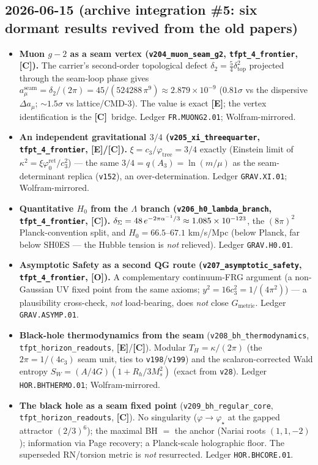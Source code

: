 \documentclass[11pt]{article}
\providecommand{\mE}{\textbf{[E]}}\providecommand{\mC}{\textbf{[C]}}
\providecommand{\mO}{\textbf{[O]}}\providecommand{\mX}{\textbf{[X]}}
\providecommand{\cthree}{c_3}\providecommand{\phiz}{\varphi_0^{\mathrm{ret}}}
\begin{document}
\subsection*{2026-06-15 (archive integration \#5: six dormant results revived from the old papers)}
\begin{itemize}
\item \textbf{Muon $g-2$ as a seam vertex (\texttt{v204\_muon\_seam\_g2}, \texttt{tfpt\_4\_frontier}, \mC).}
  The carrier's second-order topological defect $\delta_2=\tfrac54\delta_{\mathrm{top}}^2$ projected through the
  seam-loop phase gives $a_\mu^{\mathrm{seam}}=\delta_2/(2\pi)=45/(524288\,\pi^9)\approx2.879\times10^{-9}$
  ($0.81\sigma$ vs the dispersive $\Delta a_\mu$; ${\sim}1.5\sigma$ vs lattice/CMD-3). The value is exact \mE;
  the vertex identification is the \mC\ bridge. Ledger \texttt{FR.MUONG2.01}; Wolfram-mirrored.
\item \textbf{An independent gravitational $3/4$ (\texttt{v205\_xi\_threequarter}, \texttt{tfpt\_4\_frontier}, \mE/\mC).}
  $\xi=\cthree/\varphi_{\mathrm{tree}}=3/4$ exactly (Einstein limit of $\kappa^2=\xi\phiz/\cthree^2$) --- the
  same $3/4=q(A_3)=\ln(m/\mu)$ as the seam-determinant replica (\texttt{v152}), an over-determination. Ledger
  \texttt{GRAV.XI.01}; Wolfram-mirrored.
\item \textbf{Quantitative $H_0$ from the $\Lambda$ branch (\texttt{v206\_h0\_lambda\_branch}, \texttt{tfpt\_4\_frontier}, \mC).}
  $\delta_\Sigma=48\,e^{-2\pi\alpha^{-1}/3}\approx1.085\times10^{-123}$, the $(8\pi)^2$ Planck-convention split, and
  $H_0=66.5$--$67.1$ km/s/Mpc (below Planck, far below SH0ES --- the Hubble tension is \emph{not} relieved).
  Ledger \texttt{GRAV.H0.01}.
\item \textbf{Asymptotic Safety as a second QG route (\texttt{v207\_asymptotic\_safety}, \texttt{tfpt\_4\_frontier}, \mO).}
  A complementary continuum-FRG argument (a non-Gaussian UV fixed point from the same axioms;
  $y^2=16\cthree^2=1/(4\pi^2)$) --- a plausibility cross-check, \emph{not} load-bearing, does \emph{not} close
  $G_{\mathrm{metric}}$. Ledger \texttt{GRAV.ASYMP.01}.
\item \textbf{Black-hole thermodynamics from the seam} (\texttt{v208\_bh\_\allowbreak thermodynamics},
  \texttt{tfpt\_horizon\_\allowbreak readouts}, \mE/\mC).
  Modular $T_H=\kappa/(2\pi)$ (the $2\pi=1/(4\cthree)$ seam unit, ties to \texttt{v198}/\texttt{v199}) and the
  scalaron-corrected Wald entropy $S_W=(A/4G)(1+R_h/3M_s^2)$ (exact from \texttt{v28}). Ledger
  \texttt{HOR.BHTHERMO.01}; Wolfram-mirrored.
\item \textbf{The black hole as a seam fixed point} (\texttt{v209\_bh\_\allowbreak regular\_core},
  \texttt{tfpt\_horizon\_\allowbreak readouts}, \mC).
  No singularity ($\varphi\to\varphi_\star$ at the gapped attractor $(2/3)^6$); the maximal BH $=$ the anchor
  (Nariai roots $(1,1,-2)$); information via Page recovery; a Planck-scale holographic floor. The superseded
  RN/torsion metric is \emph{not} resurrected. Ledger \texttt{HOR.BHCORE.01}.
\end{itemize}
\end{document}

